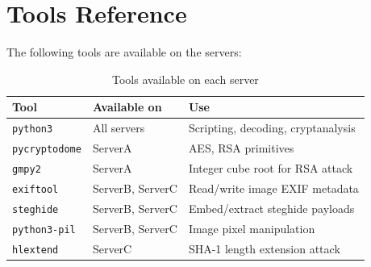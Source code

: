 \documentclass[a4paper, 12pt]{article}
\begin{document}
\section{Tools Reference}

The following tools are available on the servers:

\begin{table}[H]
\centering
\begin{tabularx}{0.92\textwidth}{llX}
\toprule
\textbf{Tool} & \textbf{Available on} & \textbf{Use} \\
\midrule
\texttt{python3}         & All servers  & Scripting, decoding, cryptanalysis \\
\texttt{pycryptodome}    & ServerA      & AES, RSA primitives \\
\texttt{gmpy2}           & ServerA      & Integer cube root for RSA attack \\
\texttt{exiftool}        & ServerB, ServerC & Read/write image EXIF metadata \\
\texttt{steghide}        & ServerB, ServerC & Embed/extract steghide payloads \\
\texttt{python3-pil}     & ServerB, ServerC & Image pixel manipulation \\
\texttt{hlextend}        & ServerC      & SHA-1 length extension attack \\
\bottomrule
\end{tabularx}
\caption{Tools available on each server}
\end{table}
\end{document}
